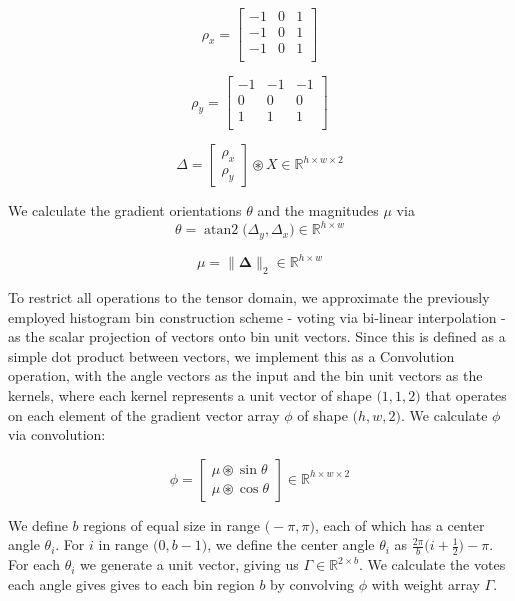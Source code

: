 \documentclass{article}
\DeclareMathOperator{\atantwo}{atan2}
\begin{document}
\[
\rho_x = \begin{bmatrix} 
-1 & 0 & 1 \\
-1 & 0 & 1 \\
-1 & 0 & 1 \\
\end{bmatrix}
\]

\[
\rho_y = \begin{bmatrix} 
{-1} & {-1} & {-1} \\
0 & 0 & 0 \\
1 & 1 & 1 \\
\end{bmatrix}

\]

\[
\Delta 
=
\begin{bmatrix}
    \rho_x \\
    \rho_y
\end{bmatrix}
\circledast
X
\in \mathbb{R}^{h\times w \times 2}
\]

We calculate the gradient orientations \(\theta\) and the magnitudes \(\mu\) via
\[
\theta = \atantwo \big(\Delta_y, \Delta_x \big)
\in \mathbb{R}^{h\times w}
\]

\[
\mu = \lVert \mathbf{\Delta} \rVert_2
\in \mathbb{R}^{h\times w}
\]

To restrict all operations to the tensor domain, we approximate the previously employed histogram bin construction scheme - voting via bi-linear interpolation - as the scalar projection of vectors onto bin unit vectors. Since this is defined as a simple dot product between vectors, we implement this as a Convolution operation, with the angle vectors as the input and the bin unit vectors as the kernels, where each kernel represents a unit vector of shape \(\big(1,  1,  2 \big) \) that operates on each element of the gradient vector array \(\phi\) of shape \(\big(h, w, 2 \big) \). We calculate \(\phi\) via convolution:

\[
\phi = 
\begin{bmatrix}
    \mu \circledast \sin{\theta}\\
    \mu \circledast \cos{\theta}
\end{bmatrix}
\in \mathbb{R}^{h\times w \times 2}
\]


We define \(b\) regions of equal size in range \(\big(-\pi, \pi \big)\), each of which has a center angle \(\theta_i\). For \(i\) in range \(\big(0, b-1 \big)\), we define the center angle \(\theta_i\) as \(\frac{2 \pi}{b}\big(i+ \frac{1}{2} \big)-\pi\). For each \(\theta_i\) we generate a unit vector, giving us \(\Gamma \in \mathbb{R}^{2\times b}\). We calculate the votes each angle gives gives to each bin region \(b\) by convolving \(\phi\) with weight array \(\Gamma\).
\end{document}
